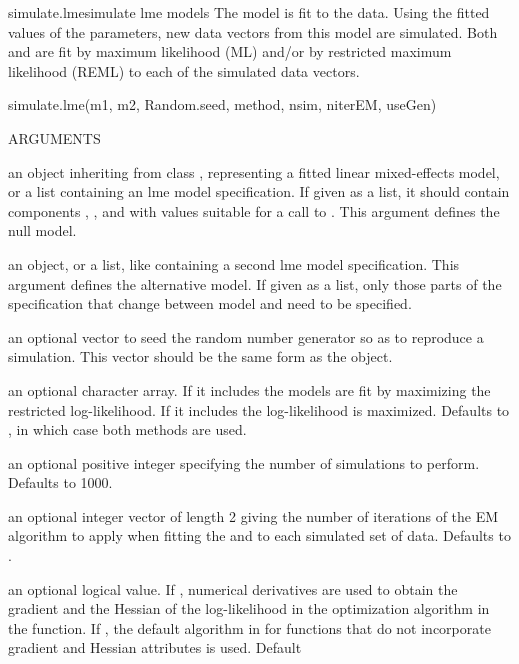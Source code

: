 \documentclass[pdftex]{article} \usepackage{url,graphicx}
\begin{document}
\begin{Helpfile}{simulate.lme}{simulate lme models}
The model  is fit to the data.  Using
the fitted values of the parameters,  new data vectors from
this model are simulated.  Both  and  are fit by
maximum likelihood (ML) and/or by restricted maximum likelihood (REML)
to each of the simulated data vectors.
\begin{Example}
simulate.lme(m1, m2, Random.seed, method, nsim, niterEM, useGen)
\end{Example}
\begin{Argument}{ARGUMENTS}
\item[\Co{m1:}]
an object inheriting from class , representing a fitted
linear mixed-effects model, or a list containing an lme model
specification.  If given as a list, it should contain
components , , and 
with values suitable for a call to . This argument
defines the null model.
\item[\Co{m2:}]
an  object, or a list, like  containing a second
lme model specification. This argument defines the alternative model.
If given as a list, only those parts of the specification that
change between model  and  need to be specified.
\item[\Co{Random.seed:}]
an optional vector to seed the random number generator so as to
reproduce a simulation.  This vector should be the same form as the
 object.
\item[\Co{method:}]
an optional character array.  If it includes  the models
are fit by maximizing the restricted log-likelihood. If it includes
 the log-likelihood is maximized.  Defaults to
, in which case both methods are used.
\item[\Co{nsim:}]
an optional positive integer specifying the number of simulations to
perform.  Defaults to 1000.
\item[\Co{niterEM:}]
an optional integer vector of length 2 giving the number of
iterations of the EM algorithm to apply when fitting the 
and  to each simulated set of data. Defaults to
. 
\item[\Co{useGen:}]
an optional logical value. If , numerical derivatives are
used to obtain the gradient and the Hessian of the log-likelihood in
the optimization algorithm in the  function. If
, the default algorithm in  for functions that
do not incorporate gradient and Hessian attributes is used. Default

\end{Argument}
\end{Helpfile}
\end{document}
